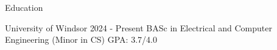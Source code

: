\documentclass{template} %
\begin{document}

\begin{rSection}{Education}
\vspace{0.1em}
  \begin{rEducationSection}{University of Windsor}
                           {2024 - Present}
                           {BASc in Electrical and Computer Engineering (Minor in CS)}
                           {GPA: 3.7/4.0}
  \end{rEducationSection}
\end{rSection}



\end{document}
